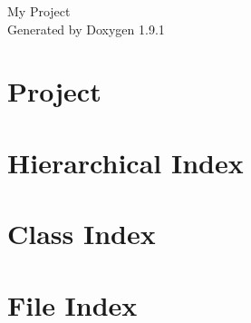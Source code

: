 \let\mypdfximage\pdfximage\def\pdfximage{\immediate\mypdfximage}\documentclass[twoside]{book}
\newcommand{\+}{\discretionary{\mbox{\scriptsize$\hookleftarrow$}}{}{}}
\newcommand{\clearemptydoublepage}{%
  \newpage{\pagestyle{empty}\cleardoublepage}%
}
\begin{document}
\raggedbottom

\hypersetup{pageanchor=false,
             bookmarksnumbered=true,
             pdfencoding=unicode
            }
\begin{titlepage}
\vspace*{7cm}
\begin{center}%
{\Large My Project }\\
\vspace*{1cm}
{\large Generated by Doxygen 1.9.1}\\
\end{center}
\end{titlepage}
\clearemptydoublepage
{}
\tableofcontents
\clearemptydoublepage
{}
\hypersetup{pageanchor=true}

\chapter{Project}
\label{md_README}

\chapter{Hierarchical Index}

\chapter{Class Index}

\chapter{File Index}

\end{document}

